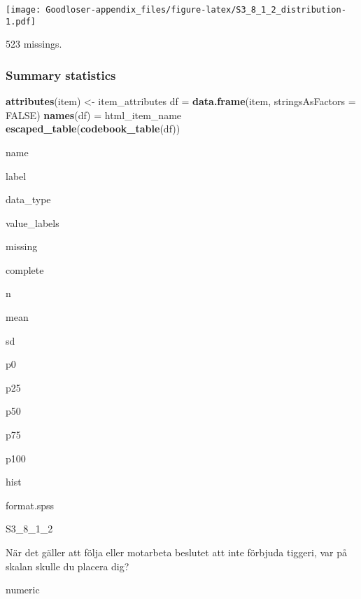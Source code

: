 \documentclass[]{book}
\newenvironment{Shaded}{\begin{snugshade}}{\end{snugshade}}
\newcommand{\KeywordTok}[1]{\textcolor[rgb]{0.13,0.29,0.53}{\textbf{#1}}}
\newcommand{\DataTypeTok}[1]{\textcolor[rgb]{0.13,0.29,0.53}{#1}}
\newcommand{\StringTok}[1]{\textcolor[rgb]{0.31,0.60,0.02}{#1}}
\newcommand{\OtherTok}[1]{\textcolor[rgb]{0.56,0.35,0.01}{#1}}
\newcommand{\OperatorTok}[1]{\textcolor[rgb]{0.81,0.36,0.00}{\textbf{#1}}}
\newcommand{\NormalTok}[1]{#1}
\begin{document}
\texttt{[image: Goodloser-appendix\_files/figure-latex/S3\_8\_1\_2\_distribution-1.pdf]}

\begin{Shaded}
\end{Shaded}

523 missings.

\subsubsection{Summary statistics}\label{S3_8_1_2_summary}

\begin{Shaded}
\begin{Highlighting}[]
\KeywordTok{attributes}\NormalTok{(item) <-}\StringTok{ }\NormalTok{item_attributes}
\NormalTok{df =}\StringTok{ }\KeywordTok{data.frame}\NormalTok{(item, }\DataTypeTok{stringsAsFactors =} \OtherTok{FALSE}\NormalTok{)}
\KeywordTok{names}\NormalTok{(df) =}\StringTok{ }\NormalTok{html_item_name}
\KeywordTok{escaped_table}\NormalTok{(}\KeywordTok{codebook_table}\NormalTok{(df))}
\end{Highlighting}
\end{Shaded}

name

label

data\_type

value\_labels

missing

complete

n

mean

sd

p0

p25

p50

p75

p100

hist

format.spss

S3\_8\_1\_2

När det gäller att följa eller motarbeta beslutet att inte förbjuda
tiggeri, var på skalan skulle du placera dig?

numeric
\end{document}
